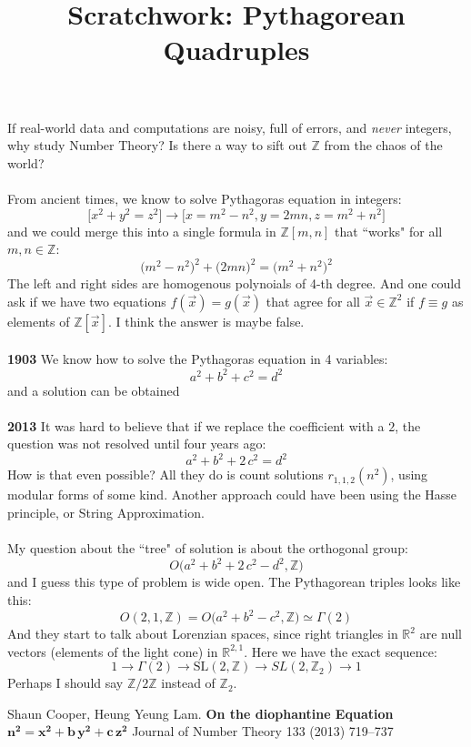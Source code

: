 \documentclass[12pt]{article}
\title{Scratchwork: Pythagorean Quadruples}
\date{}
\begin{document}

\sffamily

\maketitle

\noindent If real-world data and computations are noisy, full of errors, and \textit{never} integers, why study Number Theory?  Is there a way to sift out $\mathbb{Z}$ from the chaos of the world? \\ \\
From ancient times, we know to solve Pythagoras equation in integers:
$$ \big[ x^2 + y^2 = z^2 \big] \to \big[ x = m^2 - n^2 , y = 2mn , z = m^2 + n^2 \big]  $$
and we could merge this into a single formula in $\mathbb{Z}[m,n]$ that ``works" for all $m,n \in \mathbb{Z}$:
$$  \big(m^2 - n^2\big)^2 + \big(2mn\big)^2 = \big(m^2 + n^2 \big)^2$$
The left and right sides are homogenous polynoials of 4-th degree.  And one could ask if we have two equations $f(\vec{x}) = g(\vec{x})$ that agree for all $\vec{x} \in \mathbb{Z}^2$ if $f \equiv g$ as elements of $\mathbb{Z}[\vec{x}]$.  I think the answer is maybe false. \\ \\
\textbf{1903} We know how to solve the Pythagoras equation in 4 variables:
$$ a^2 + b^2 + c^2 = d^2 $$
and a solution can be obtained \\ \\
\textbf{2013} It was hard to believe that if we replace the coefficient with a $2$, the question was not resolved until four years ago:
$$ a^2 + b^2 + 2\, c^2 = d^2  $$
How is that even possible?  All they do is count solutions $r_{1,1,2}(n^2)$, using modular forms of some kind.  Another approach could have been using the Hasse principle, or String Approximation. \\ \\
My question about the ``tree" of solution is about the orthogonal group:
$$ O \big( a^2 + b^2 + 2\, c^2 - d^2 , \mathbb{Z} \big)  $$
and I guess this type of problem is wide open.  The Pythagorean triples looks like this:
$$ O(2,1, \mathbb{Z}) = O \big( a^2 + b^2 - c^2  , \mathbb{Z} \big)  \simeq \Gamma(2)$$
And they start to talk about Lorenzian spaces, since right triangles in $\mathbb{R}^2$ are null vectors (elements of the light cone)  in $\mathbb{R}^{2,1}$.  Here we have the exact sequence:
$$ 1 \to \Gamma(2) \to \text{SL}(2, \mathbb{Z}) \to SL(2, \mathbb{Z}_2) \to 1$$
Perhaps I should say $\mathbb{Z}/2\mathbb{Z}$ instead of $\mathbb{Z}_2$.

\vfill

\begin{thebibliography}{}

\item Shaun Cooper, Heung Yeung Lam.  \textbf{On the diophantine Equation $\mathbf{n^2 = x^2 + b\, y^2 + c\, z^2}$} Journal of Number Theory 133 (2013) 719–737
 
\end{thebibliography}
\end{document}
